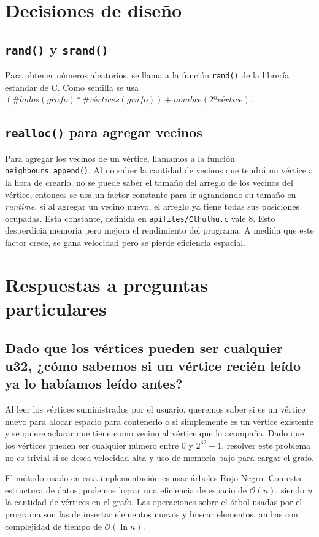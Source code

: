 \documentclass[11pt]{article}   	%
\begin{document}
\section{Decisiones de diseño}
\subsection{\texttt{rand()} y \texttt{srand()}}
Para obtener números aleatorios, se llama a la función \texttt{rand()} de la librería estandar de C. Como semilla se usa
$(\#lados(grafo) * \#vértices(grafo)) + nombre(2ºvértice)$.

\subsection{\texttt{realloc()} para agregar vecinos}
Para agregar los vecinos de un vértice, llamamos a la función \texttt{neighbours\_append()}. Al no saber la cantidad de vecinos que tendrá
un vértice a la hora de crearlo, no se puede saber el tamaño del arreglo de los vecinos del vértice, entonces se usa un factor constante para ir
agrandando su tamaño en \emph{runtime}, si al agregar un vecino nuevo, el arreglo ya tiene todas sus posiciones ocupadas. Esta constante, definida en
\texttt{apifiles/Cthulhu.c} vale 8. Esto desperdicia memoria pero mejora el rendimiento del programa. A medida que este factor crece, se gana velocidad
pero se pierde eficiencia espacial.
\clearpage

\section{Respuestas a preguntas particulares}
\subsection{Dado que los vértices pueden ser cualquier u32, ¿cómo sabemos si un vértice recién leído ya
lo habíamos leído antes?}
Al leer los vértices suministrados
por el usuario, queremos saber si es un vértice nuevo para alocar espacio para contenerlo o si simplemente
es un vértice existente y se quiere aclarar que tiene como vecino al vértice que lo acompaña.
Dado que los vértices pueden ser cualquier número entre 0 y $2^{32}-1$, resolver este problema no es trivial
si se desea velocidad alta y uso de memoria bajo para cargar el grafo.

El método usado en esta implementación es usar árboles Rojo-Negro. Con esta estructura
de datos, podemos lograr una eficiencia de espacio de $\mathcal{O}(n)$, siendo \emph{n} la cantidad de
vértices en el grafo. Las operaciones sobre el árbol usadas por el programa son las de insertar elementos
nuevos y buscar elementos, ambas con complejidad de tiempo de $\mathcal{O}(\ln{n})$.
\end{document}

